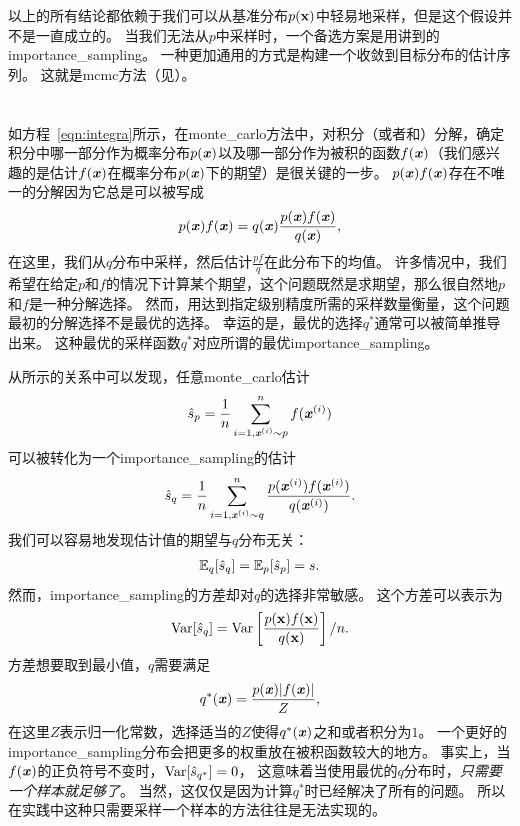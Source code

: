 以上的所有结论都依赖于我们可以从基准分布$p(\mathbf{x})$中轻易地采样，但是这个假设并不是一直成立的。
当我们无法从$p$中采样时，一个备选方案是用讲到的\gls{importance_sampling}。 
一种更加通用的方式是构建一个收敛到目标分布的估计序列。 
这就是\gls{mcmc}方法（见）。

\section{}
\label{sec:importance_sampling_chap17}

如方程~\eqref{eqn:integra}所示，在\gls{monte_carlo}方法中，对积分（或者和）分解，确定积分中哪一部分作为概率分布$p(\boldsymbol{\mathit{x}})$以及哪一部分作为被积的函数$f(\boldsymbol{\mathit{x}})$（我们感兴趣的是估计$f(\boldsymbol{\mathit{x}})$在概率分布$p(\boldsymbol{\mathit{x}})$下的期望）是很关键的一步。  
$p(\boldsymbol{\mathit{x}})f(\boldsymbol{\mathit{x}})$存在不唯一的分解因为它总是可以被写成   
\begin{align}
\label{eqn:decomposition}
p(\boldsymbol{\mathit{x}})f(\boldsymbol{\mathit{x}}) = q(\boldsymbol{\mathit{x}}) \frac{p(\boldsymbol{\mathit{x}})f(\boldsymbol{\mathit{x}})}{q(\boldsymbol{\mathit{x}})},
\end{align}
在这里，我们从$q$分布中采样，然后估计$\frac{pf}{q}$在此分布下的均值。
许多情况中，我们希望在给定$p$和$f$的情况下计算某个期望，这个问题既然是求期望，那么很自然地$p$和$f$是一种分解选择。 
然而，用达到指定级别精度所需的采样数量衡量，这个问题最初的分解选择不是最优的选择。
幸运的是，最优的选择$q^*$通常可以被简单推导出来。   
这种最优的采样函数$q^*$对应所谓的最优\gls{importance_sampling}。 


从所示的关系中可以发现，任意\gls{monte_carlo}估计   
\begin{align}
\hat{s}_p = \frac{1}{n}\sum_{i=1,\boldsymbol{\mathit{x}}^{(i)}\sim p}^{n}f(\boldsymbol{\mathit{x}}^{(i)})
\end{align}
可以被转化为一个\gls{importance_sampling}的估计
\begin{align}
\hat{s}_q = \frac{1}{n}\sum_{i=1,\boldsymbol{\mathit{x}}^{(i)}\sim q}^{n}\frac{p(\boldsymbol{\mathit{x}}^{(i)})f(\boldsymbol{\mathit{x}}^{(i)})}{q(\boldsymbol{\mathit{x}}^{(i)})}.
\end{align}
我们可以容易地发现估计值的期望与$q$分布无关：   
\begin{align}
\mathbb{E}_q [\hat{s}_q] = \mathbb{E}_p [\hat{s}_p] = s.      
\end{align}
然而，\gls{importance_sampling}的方差却对$q$的选择非常敏感。 
这个方差可以表示为
\begin{align}
\label{eqn:variance_of_is}
\text{Var} [\hat{s}_q] = \text{Var} \left[\frac{p(\mathbf{x})f(\mathbf{x})}{q(\mathbf{x})}\right]/n.
\end{align}
方差想要取到最小值，$q$需要满足
\begin{align}
q^*(\boldsymbol{\mathit{x}}) = \frac{p(\boldsymbol{\mathit{x}})\vert f(\boldsymbol{\mathit{x}})\vert}{Z},
\end{align}
在这里$Z$表示归一化常数，选择适当的$Z$使得$q^*(\boldsymbol{\mathit{x}})$之和或者积分为$1$。
一个更好的\gls{importance_sampling}分布会把更多的权重放在被积函数较大的地方。 
事实上，当$f(\boldsymbol{\mathit{x}})$的正负符号不变时，$\text{Var}[\hat{s}_{q^*}]=0$， 这意味着当使用最优的$q$分布时，\emph{只需要一个样本就足够了}。
当然，这仅仅是因为计算$q^*$时已经解决了所有的问题。   
所以在实践中这种只需要采样一个样本的方法往往是无法实现的。 


